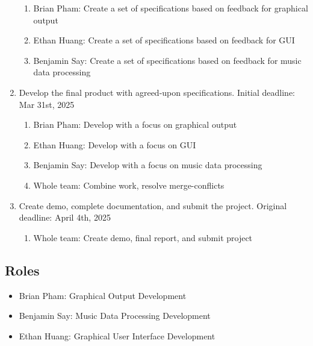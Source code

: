 \documentclass{article}
\begin{document}
\begin{enumerate}
    \begin{enumerate}
        \item Brian Pham: Create a set of specifications based on feedback for graphical output
        \item Ethan Huang: Create a set of specifications based on feedback for GUI
        \item Benjamin Say: Create a set of specifications based on feedback for music data processing \end{enumerate}
    \item Develop the final product with agreed-upon specifications. Initial deadline: Mar 31st, 2025
    \begin{enumerate}
        \item Brian Pham: Develop with a focus on graphical output
        \item Ethan Huang: Develop with a focus on GUI
        \item Benjamin Say: Develop with a focus on music data processing 
        \item Whole team: Combine work, resolve merge-conflicts\end{enumerate}
    \item Create demo, complete documentation, and submit the project. Original deadline: April 4th, 2025
    \begin{enumerate}
        \item Whole team: Create demo, final report, and submit project \end{enumerate}
\end{enumerate}


\subsection{Roles}

\begin{itemize}
    \item Brian Pham: Graphical Output Development
    \item Benjamin Say: Music Data Processing Development
    \item Ethan Huang: Graphical User Interface Development
\end{itemize}


\end{document}
